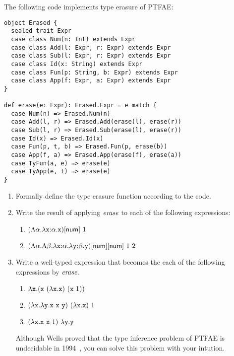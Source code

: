 \begin{exercise}

The following code implements type erasure of \textsf{PTFAE}:

\begin{verbatim}
object Erased {
  sealed trait Expr
  case class Num(n: Int) extends Expr
  case class Add(l: Expr, r: Expr) extends Expr
  case class Sub(l: Expr, r: Expr) extends Expr
  case class Id(x: String) extends Expr
  case class Fun(p: String, b: Expr) extends Expr
  case class App(f: Expr, a: Expr) extends Expr
}

def erase(e: Expr): Erased.Expr = e match {
  case Num(n) => Erased.Num(n)
  case Add(l, r) => Erased.Add(erase(l), erase(r))
  case Sub(l, r) => Erased.Sub(erase(l), erase(r))
  case Id(x) => Erased.Id(x)
  case Fun(p, t, b) => Erased.Fun(p, erase(b))
  case App(f, a) => Erased.App(erase(f), erase(a))
  case TyFun(a, e) => erase(e)
  case TyApp(e, t) => erase(e)
}
\end{verbatim}

\begin{enumerate}
  \item Formally define the type erasure function
     according to the code.
  \item Write the result of applying $\mbox{\emph{erase}}$ to each of the following
    expressions:
    \begin{enumerate}
      \item
        $(\Lambda\alpha.\lambda\texttt{x}{:}\alpha.\texttt{x})[\textsf{num}]\ 1$
      \item
        $(\Lambda\alpha.\Lambda\beta.\lambda\texttt{x}{:}\alpha.\lambda\texttt{y}{:}\beta.\texttt{y})[\textsf{num}][\textsf{num}]\ 1\ 2$
    \end{enumerate}
\item Write a well-typed expression that becomes the each of the following
  expressions by $\mbox{\emph{erase}}$.

    \begin{enumerate}
      \item
        $\efun{\cx}{\eapp{(\eapp{\cx}{(\efun{\cx}{\cx})}}{(\cx\ 1))}}$
      \item
        $(\lambda\texttt{x}.\lambda\texttt{y}.\texttt{x}\ \texttt{x}\ \texttt{y})\ (\lambda\texttt{x}.\texttt{x})\ 1$
      \item
        $(\lambda\texttt{x}.\texttt{x}\ \texttt{x}\ 1)\ \lambda\texttt{y}.\texttt{y}$
    \end{enumerate}

    Although Wells proved that the type inference problem of \textsf{PTFAE} is
    undecidable in 1994~\cite{wells1994typability}, you can solve this problem
    with your intution.

\end{enumerate}

\end{exercise}

